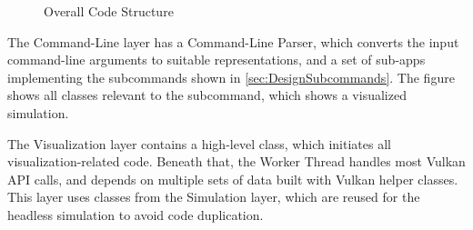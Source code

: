 \begin{figure}[p]
    \centering
    \caption{Overall Code Structure}
    \label{fig:designstructure}
\end{figure}
\pagebreak

The Command-Line layer has a Command-Line Parser, which converts the input command-line arguments to suitable representations, and a set of sub-apps implementing the subcommands shown in \cref{sec:DesignSubcommands}.
The figure shows all classes relevant to the  subcommand, which shows a visualized simulation.

The Visualization layer contains a high-level  class, which initiates all visualization-related code.
Beneath that, the Worker Thread handles most Vulkan API calls, and depends on multiple sets of data built with Vulkan helper classes.
This layer uses classes from the Simulation layer, which are reused for the headless simulation to avoid code duplication.

